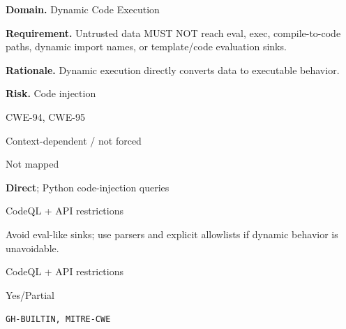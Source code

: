 \documentclass[10pt,letterpaper]{article}
\newcommand{\prioritybadge}[2]{\tcbox[on line,boxrule=0pt,arc=1.2mm,boxsep=0.7mm,left=1mm,right=1mm,top=0.4mm,bottom=0.4mm,colback=#2!12,coltext=#2]{\scriptsize\bfseries #1}}
\begin{document}
\begin{rulebox}[title={\texttt{SCS-PY-DYN-001} \hfill \prioritybadge{Critical Control}{Critical}}]
\textbf{Domain.} Dynamic Code Execution

\textbf{Requirement.} Untrusted data MUST NOT reach eval, exec, compile-to-code paths, dynamic import names, or template/code evaluation sinks.

\textbf{Rationale.} Dynamic execution directly converts data to executable behavior.

\textbf{Risk.} Code injection

\begin{description}[leftmargin=2.65cm,labelwidth=2.3cm,style=nextline,itemsep=1pt,topsep=3pt]
  \item[CWE] CWE-94, CWE-95
  \item[OWASP] Context-dependent / not forced
  \item[CERT] Not mapped
  \item[CodeQL] \textbf{Direct}; Python code-injection queries
  \item[Enforcement] CodeQL + API restrictions
  \item[Prevention] Avoid eval-like sinks; use parsers and explicit allowlists if dynamic behavior is unavoidable.
  \item[Verification] CodeQL + API restrictions
  \item[Automation] Yes/Partial
  \item[Sources] \texttt{GH-BUILTIN, MITRE-CWE}
\end{description}
\end{rulebox}
\end{document}
